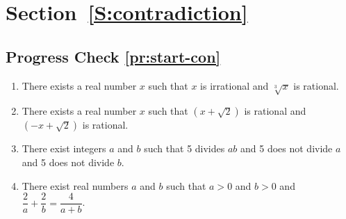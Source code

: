 \section*{Section~\ref{S:contradiction}}

\subsection*{Progress Check \ref{pr:start-con}}
\begin{enumerate}
\item There exists a real number $x$ such that $x$ is irrational and $\sqrt[3]{x}$ is rational.
\item There exists a real number $x$ such that $\left(x + \sqrt{2} \right)$ is rational and 
$\left(-x + \sqrt{2} \right)$ is rational.
\item There exist integers $a$ and $b$ such that 5 divides $ab$ and 5 does not divide $a$ and 5 does not divide $b$.
\item There exist real numbers $a$ and $b$ such that $a > 0$ and $b > 0$ and  
$\dfrac{2}{a} + \dfrac{2}{b} = \dfrac{4}{a + b}$.
\end{enumerate}


